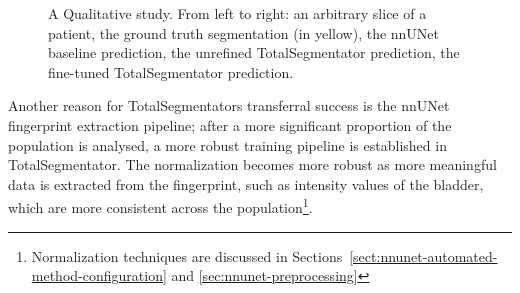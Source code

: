 \documentclass[11pt,twoside]{report}
\begin{document}
\begin{figure}[H]
  \centering
  \caption{A Qualitative study. From left to right: an arbitrary slice of a patient, the ground truth segmentation (in yellow), the nnUNet baseline prediction, the unrefined TotalSegmentator prediction, the fine-tuned TotalSegmentator prediction.}\label{fig:bladder-totalsegmentator-qualitative}
\end{figure}

\clearpage

Another reason for TotalSegmentators transferral success is the nnUNet fingerprint extraction pipeline; after a more significant proportion of the population is analysed, a more robust training pipeline is established in TotalSegmentator. The normalization becomes more robust as more meaningful data is extracted from the fingerprint, such as intensity values of the bladder, which are more consistent across the population\footnote{Normalization techniques are discussed in Sections~\ref{sect:nnunet-automated-method-configuration} and \ref{sec:nnunet-preprocessing}}.
\end{document}
